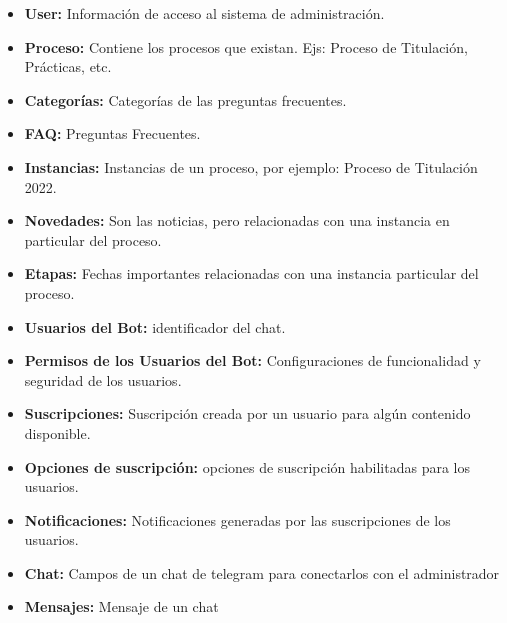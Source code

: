     \begin{itemize}
        \item \textbf{User:} Información de acceso al sistema de administración.
        \item \textbf{Proceso:} Contiene los procesos que existan. Ejs: Proceso de Titulación, Prácticas, etc.
        \item \textbf{Categorías:} Categorías de las preguntas frecuentes.
        \item \textbf{FAQ:} Preguntas Frecuentes.
        \item \textbf{Instancias:} Instancias de un proceso, por ejemplo: Proceso de Titulación 2022.
        \item \textbf{Novedades:} Son las noticias, pero relacionadas con una instancia en particular del proceso.
        \item \textbf{Etapas:} Fechas importantes relacionadas con una instancia particular del proceso.
        \item \textbf{Usuarios del Bot:} identificador del chat.
        \item \textbf{Permisos de los Usuarios del Bot:} Configuraciones de funcionalidad y seguridad de los usuarios.
        \item \textbf{Suscripciones:} Suscripción creada por un usuario para algún contenido disponible.
        \item \textbf{Opciones de suscripción:} opciones de suscripción habilitadas para los usuarios.
        \item \textbf{Notificaciones:} Notificaciones generadas por las suscripciones de los usuarios.
        \item \textbf{Chat:} Campos de un chat de telegram para conectarlos con el administrador
        \item \textbf{Mensajes:} Mensaje de un chat
    \end{itemize}
    
    